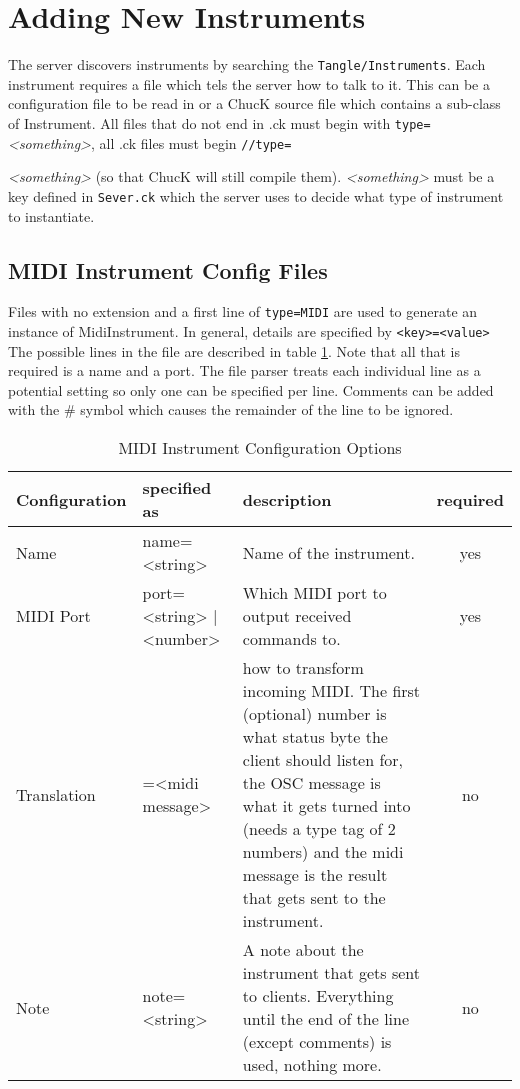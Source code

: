 \documentclass[11pt]{article}
\begin{document}
\section{Adding New Instruments}
The server discovers instruments by searching the \texttt{Tangle/Instruments}. Each instrument requires a file which tels the server how to talk to it. This can be a 
configuration file to be read in or a ChucK source file which contains a sub-class of Instrument.
All files that do not end in .ck must begin with \texttt{type=}\textit{<something>}, all .ck files must begin \texttt{//type=}{\textit{<something>} (so that ChucK will
still compile them). \textit{<something>} must be a key defined in \texttt{Sever.ck} which the server uses to decide what type of instrument to instantiate.

\subsection{MIDI Instrument Config Files}
Files with no extension and a first line of \texttt{type=MIDI} are used to generate an instance of MidiInstrument. In general, details are specified by \texttt{<key>=<value>}
The possible lines in the file are described in table \ref{tab:midifile}. Note that all that is required is a name and a port. The file parser treats each individual line
as a potential setting so only one can be specified per line. Comments can be added with the \# symbol which causes the remainder of the line to be ignored.

\begin{table} [h]
\caption{MIDI Instrument Configuration Options}
\label{tab:midifile}
\begin{tabularx} {\textwidth} {| l | >{\ttfamily}X | X | c |}
\hline
Configuration & specified as & description & required \\
\hline \hline
Name & name=<string> & Name of the instrument. & yes \\
\hline
MIDI Port & port=<string> | <number> & Which MIDI port to output received commands to. & yes \\
\hline
Translation & [<number>=]<osc message>=<midi message> & how to transform incoming MIDI. 
												The first (optional) number is what status 
												byte the client should listen for,
												the OSC message is what it gets turned
												into (needs a type tag of 2 numbers)
												and the midi message is the result
												that gets sent to the instrument. & no \\
\hline
Note & note=<string> & A note about the instrument that gets sent to clients. Everything until the end of 
				     the line (except comments) is used, nothing more. & no \\
\hline


\end{tabularx}
\end{table}}
\end{document}
